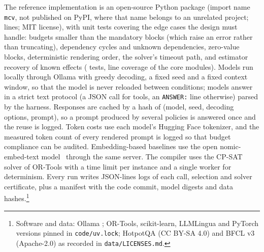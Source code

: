 The reference implementation is an open-source Python package (import name \texttt{mcv}, not published on PyPI, where
that name belongs to an unrelated project; \RLoc{} lines; MIT license), with unit tests
covering the edge cases the design must handle: budgets smaller than the mandatory blocks (which raise an error rather than
truncating), dependency cycles and unknown dependencies, zero-value blocks, deterministic rendering order, the solver's
timeout path, and estimator recovery of known effects (\RTests{} tests, \RCoverage{} line coverage of the core
modules). Models run locally through Ollama with greedy decoding, a fixed seed and a fixed context window, so that the
model is never reloaded between conditions; models answer in a strict text protocol (a JSON call for tools, an
\texttt{ANSWER:} line otherwise) parsed by the harness. Responses are cached by a hash of (model, seed, decoding options,
prompt), so a prompt produced by several policies is answered once and the reuse is logged. Token costs use each model's
Hugging Face tokenizer, and the measured token count of every rendered prompt is logged so that budget compliance can be
audited. Embedding-based baselines use the open nomic-embed-text model~\citep{nomicembed2024} through the same server.
The compiler uses the CP-SAT solver of OR-Tools with a time limit per instance and a single worker for determinism.
Every run writes JSON-lines logs of each call, selection and solver certificate, plus a manifest with the code commit,
model digests and data hashes.\footnote{Software and data: Ollama \ROllamaVersion; OR-Tools, scikit-learn, LLMLingua and PyTorch
versions pinned in \texttt{code/uv.lock}; HotpotQA (CC BY-SA 4.0) and BFCL v3 (Apache-2.0) as recorded in
\texttt{data/LICENSES.md}.}
